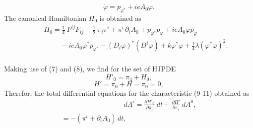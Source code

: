 \documentclass[12pt]{article}
\begin{document}
\begin{equation}\label{30}
{\dot{\varphi}}=p_{{\varphi}^{\ast}}+ieA_{0}{\varphi}.
\end{equation}
The canonical Hamiltonian $H_{0}$ is obtained as
\begin{multline}\label{25}
\qquad
H_{0}=\frac{1}{4}\>F^{ij}F_{ij}-\frac{1}{2}\>\pi_{i}\pi^{i}+\pi^{i}\,\partial_{i}A_{0}+p_{{\varphi}^{\ast}}p_{\varphi}+ieA_{0}{\varphi}p_{\varphi}
\\\,\,\qquad\qquad-ieA_{0}{\varphi}^{\ast}p_{{\varphi}^{\ast}}-(D_{i}\varphi)^{\ast}(D^{i}\varphi)
+k{\varphi}^{\ast}\varphi+\frac{1}{4}\lambda({\varphi}^{\ast}\varphi)^2.
\end{multline}\\
Making use of (7) and (8), we find for the set of HJPDE
\begin{equation}\label{26}
H'_{0}=\pi_{4}+H_{0},
\end{equation}
\begin{equation}\label{27}
H'=\pi_{0}+H=\pi_{0}=0,
\end{equation}
Therefor, the total differential equations for the characteristic
(9-11) obtained as
\begin{multline}
\quad \quad \quad \quad\qquad\qquad\quad dA^{i}=\frac{\partial
H'_{0}}{\partial\pi_{i}}\>dt+\frac{\partial
H'}{\partial\pi_{i}}\>dA^0,\\
=-(\pi^{i}+\partial_{i}A_{0})\,dt,\quad \quad \quad \quad \quad
\quad \quad \quad \quad \,\,\,\,\,\label{28}
\end{multline}
\end{document}
